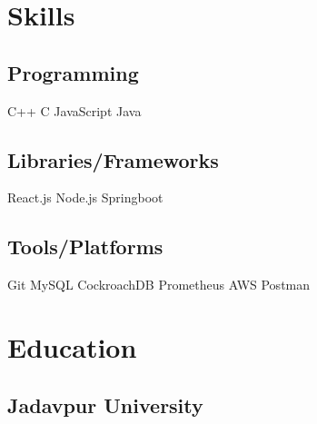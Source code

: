 \documentclass[]{plushcv}
\begin{document}
\hfill
\begin{minipage}[t]{0.25\textwidth} 


\section{Skills}
\subsection{Programming}
\sectionsep
C++ \textbullet{} C \textbullet{} JavaScript \textbullet{} Java
\sectionsep
\subsection{Libraries/Frameworks}
\sectionsep
React.js \textbullet{} Node.js \textbullet{} Springboot \\
\sectionsep
\sectionsep
\subsection{Tools/Platforms}
\sectionsep
Git \textbullet{} MySQL \textbullet{} CockroachDB  \textbullet{} Prometheus  \textbullet{} AWS \textbullet{} Postman\\

\sectionsep


\section{Education} 
\subsection{Jadavpur University}



\end{minipage}
\end{document}
